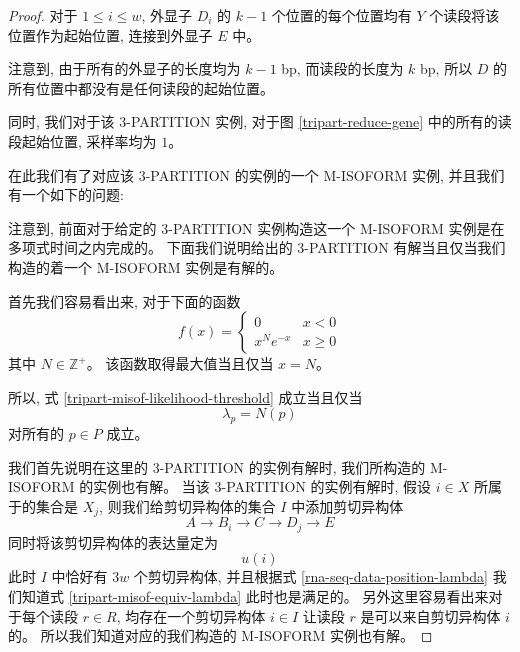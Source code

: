 \begin{proof}
对于 $1\leq i \leq w$,
外显子 $D_i$ 的 $k-1$ 个位置的每个位置均有 $Y$ 个读段将该位置作为起始位置, 
连接到外显子 $E$ 中。 

注意到, 由于所有的外显子的长度均为 $k-1$ bp, 而读段的长度为 $k$ bp, 
所以 $D$ 的所有位置中都没有是任何读段的起始位置。 

同时, 我们对于该 3-PARTITION 实例, 
对于图 \ref{tripart-reduce-gene} 中的所有的读段起始位置, 采样率均为 $1$。 

在此我们有了对应该 3-PARTITION 的实例的一个 M-ISOFORM 实例, 并且我们有一个如下的问题: 
\begin{center}
\end{center}

注意到, 前面对于给定的 3-PARTITION 实例构造这一个 M-ISOFORM 实例是在多项式时间之内完成的。 
下面我们说明给出的 3-PARTITION 有解当且仅当我们构造的着一个 M-ISOFORM 实例是有解的。 

首先我们容易看出来, 
对于下面的函数
\[
f(x) = \begin{cases}
0 & x < 0 \\
x^N e^{-x} & x \geq 0
\end{cases}
\]
其中 $N \in \mathbb{Z}^+$。 
该函数取得最大值当且仅当 $x=N$。 

所以, 式 \eqref{tripart-misof-likelihood-threshold} 成立当且仅当
\begin{equation}
\label{tripart-misof-equiv-lambda}
\lambda_p=N(p)
\end{equation}
对所有的 $p\in P$ 成立。  

我们首先说明在这里的 3-PARTITION 的实例有解时, 
我们所构造的 M-ISOFORM 的实例也有解。 
当该 3-PARTITION 的实例有解时, 假设 $i\in X$ 所属于的集合是 $X_j$, 
则我们给剪切异构体的集合 $I$ 中添加剪切异构体 
\[
A\to B_i \to C \to D_j \to E
\] 
同时将该剪切异构体的表达量定为 
\[
u(i)
\] 
此时 $I$ 中恰好有 $3w$ 个剪切异构体, 
并且根据式 \eqref{rna-seq-data-position-lambda} 我们知道式 
\eqref{tripart-misof-equiv-lambda} 此时也是满足的。 
另外这里容易看出来对于每个读段 $r\in R$, 
均存在一个剪切异构体 $i\in I$ 让读段 $r$ 是可以来自剪切异构体 $i$ 的。
所以我们知道对应的我们构造的 M-ISOFORM 实例也有解。 


\end{proof}
